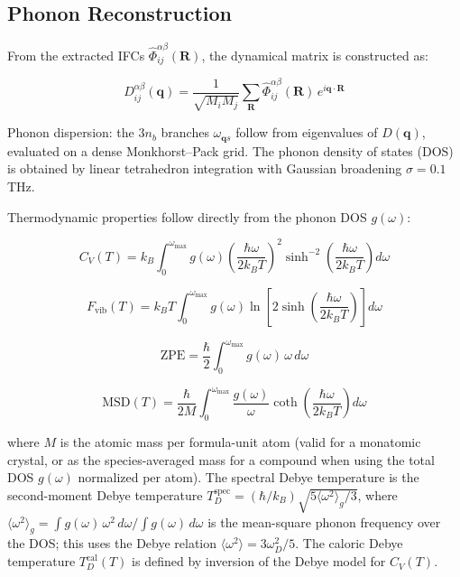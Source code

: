\documentclass[aps,prb,reprint,amsmath,amssymb,floatfix]{revtex4-2}
\begin{document}
\subsection{Phonon Reconstruction}\label{phonon-reconstruction}

From the extracted IFCs \(\hat{\Phi}_{ij}^{\alpha\beta}(\mathbf{R})\),
the dynamical matrix is constructed as:

\begin{equation}
D_{ij}^{\alpha\beta}(\mathbf{q}) = \frac{1}{\sqrt{M_i M_j}} \sum_{\mathbf{R}} \hat{\Phi}_{ij}^{\alpha\beta}(\mathbf{R})\, e^{i\mathbf{q}\cdot\mathbf{R}} \tag{8}
\end{equation}

Phonon dispersion: the \(3n_b\) branches \(\omega_{\mathbf{q}s}\) follow
from eigenvalues of \(D(\mathbf{q})\), evaluated on a dense
Monkhorst--Pack grid. The phonon density of states (DOS) is obtained by
linear tetrahedron integration with Gaussian broadening \(\sigma = 0.1\)
THz.

Thermodynamic properties follow directly from the phonon DOS
\(g(\omega)\):

\begin{equation}
C_V(T) = k_B \int_0^{\omega_\text{max}} g(\omega) \left(\frac{\hbar\omega}{2k_BT}\right)^2 \sinh^{-2}\!\left(\frac{\hbar\omega}{2k_BT}\right) d\omega \tag{9}
\end{equation}

\begin{equation}
F_\text{vib}(T) = k_B T \int_0^{\omega_\text{max}} g(\omega) \ln\!\left[2\sinh\!\left(\frac{\hbar\omega}{2k_BT}\right)\right] d\omega \tag{10}
\end{equation}

\begin{equation}
\text{ZPE} = \frac{\hbar}{2}\int_0^{\omega_\text{max}} g(\omega)\,\omega\, d\omega \tag{11}
\end{equation}

\begin{equation}
\text{MSD}(T) = \frac{\hbar}{2M} \int_0^{\omega_\text{max}} \frac{g(\omega)}{\omega} \coth\!\left(\frac{\hbar\omega}{2k_BT}\right) d\omega \tag{12}
\end{equation}

where \(M\) is the atomic mass per formula-unit atom (valid for a
monatomic crystal, or as the species-averaged mass for a compound when
using the total DOS \(g(\omega)\) normalized per atom). The spectral Debye temperature is the second-moment Debye temperature
\(T_D^\text{spec} = (\hbar/k_B)\sqrt{5\langle\omega^2\rangle_g/3}\),
where
\(\langle\omega^2\rangle_g = \int g(\omega)\,\omega^2\,d\omega/\int g(\omega)\,d\omega\)
is the mean-square phonon frequency over the DOS; this uses the Debye
relation \(\langle\omega^2\rangle = 3\omega_D^2/5\). The caloric Debye
temperature \(T_D^\text{cal}(T)\) is defined by inversion of the Debye
model for \(C_V(T)\).
\end{document}
